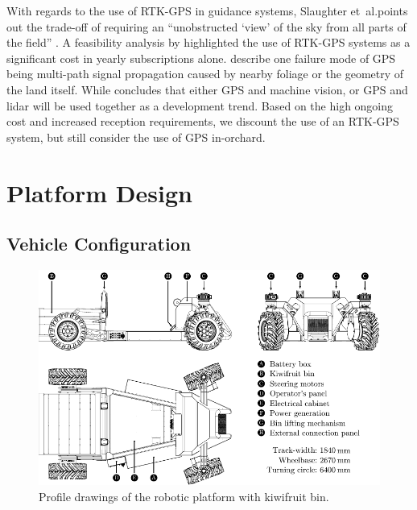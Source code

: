 \documentclass[preprint,authoryear,12pt]{elsarticle}
\begin{document}
        With regards to the use of RTK-GPS in guidance systems, Slaughter et~al.\@ points out the trade-off of requiring an ``unobstructed `view' of the sky from all parts of the field'' \citep{Slaughter2008}.
        A feasibility analysis by \cite{Pedersen2006} highlighted the use of RTK-GPS systems as a significant cost in yearly subscriptions alone.
        \cite{Durrant-Whyte2005} describe one failure mode of GPS being multi-path signal propagation caused by nearby foliage or the geometry of the land itself.
        While \cite{Li2009} concludes that either GPS and machine vision, or GPS and lidar will be used together as a development trend.
        Based on the high ongoing cost and increased reception requirements, we discount the use of an RTK-GPS system, but still consider the use of GPS in-orchard.

\section{Platform Design}

    \subsection{Vehicle Configuration}
    \label{sect:mechanical}

        \begin{figure}[htb]
            \centering
            \includegraphics[width=\linewidth]{imgs/profile_views/AMMP-All-Labelled.pdf}
            \caption{Profile drawings of the robotic platform with kiwifruit bin.}
            \label{fig:AMMP}
        \end{figure}
\end{document}
